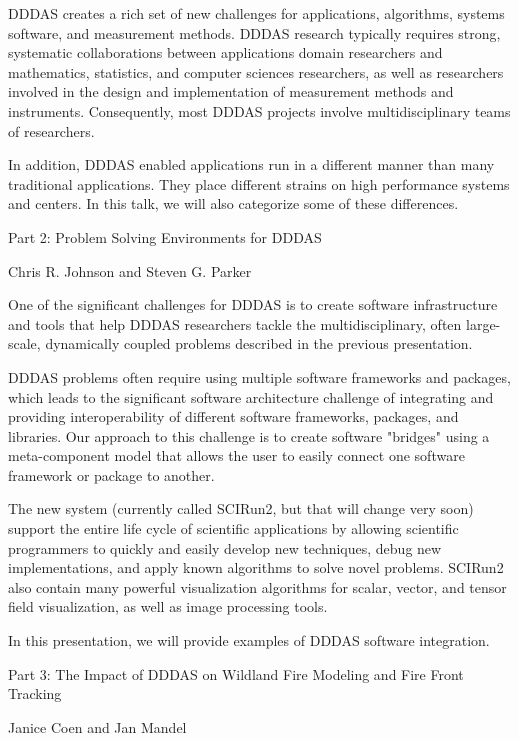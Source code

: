 \documentclass{report}
\begin{document}
DDDAS creates a rich set of new challenges for applications, algorithms,
systems software, and measurement methods. DDDAS research typically
requires strong, systematic collaborations between applications domain
researchers and mathematics, statistics, and computer sciences
researchers, as well as researchers involved in the design and
implementation of measurement methods and instruments. Consequently, most
DDDAS projects involve multidisciplinary teams of researchers.

In addition, DDDAS enabled applications run in a different manner than
many traditional applications. They place different strains on high
performance systems and centers. In this talk, we will also categorize
some of these differences.


Part 2: Problem Solving Environments for DDDAS

Chris R. Johnson and Steven G. Parker

One of the significant challenges for DDDAS is to create software
infrastructure and tools that help DDDAS researchers tackle the
multidisciplinary, often large-scale, dynamically coupled problems
described in the previous presentation.

DDDAS problems often require using multiple software frameworks and
packages, which leads to the significant software architecture challenge
of integrating and providing interoperability of different software
frameworks, packages, and libraries. Our approach to this challenge is to
create software "bridges" using a meta-component model that allows the
user to easily connect one software framework or package to another.

The new system (currently called SCIRun2, but that will change very soon)
support the entire life cycle of scientific applications by allowing
scientific programmers to quickly and easily develop new techniques,
debug new implementations, and apply known algorithms to solve novel
problems. SCIRun2 also contain many powerful visualization algorithms for
scalar, vector, and tensor field visualization, as well as image
processing tools.

In this presentation, we will provide examples of DDDAS software integration.


Part 3: The Impact of DDDAS on Wildland Fire Modeling and Fire Front Tracking

Janice Coen and Jan Mandel
\end{document}
